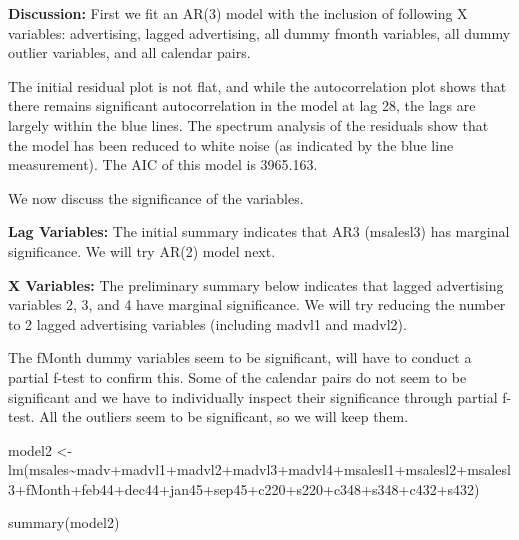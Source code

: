 \documentclass[
]{article}
\newenvironment{Shaded}{\begin{snugshade}}{\end{snugshade}}
\newcommand{\FunctionTok}[1]{\textcolor[rgb]{0.00,0.00,0.00}{#1}}
\newcommand{\NormalTok}[1]{#1}
\newcommand{\OtherTok}[1]{\textcolor[rgb]{0.56,0.35,0.01}{#1}}
\newcommand{\SpecialCharTok}[1]{\textcolor[rgb]{0.00,0.00,0.00}{#1}}
\begin{document}
\textbf{Discussion:} First we fit an AR(3) model with the inclusion of
following X variables: advertising, lagged advertising, all dummy fmonth
variables, all dummy outlier variables, and all calendar pairs.

The initial residual plot is not flat, and while the autocorrelation
plot shows that there remains significant autocorrelation in the model
at lag 28, the lags are largely within the blue lines. The spectrum
analysis of the residuals show that the model has been reduced to white
noise (as indicated by the blue line measurement). The AIC of this model
is 3965.163.

We now discuss the significance of the variables.

\textbf{Lag Variables:} The initial summary indicates that AR3
(msalesl3) has marginal significance. We will try AR(2) model next.

\textbf{X Variables:} The preliminary summary below indicates that
lagged advertising variables 2, 3, and 4 have marginal significance. We
will try reducing the number to 2 lagged advertising variables
(including madvl1 and madvl2).

The fMonth dummy variables seem to be significant, will have to conduct
a partial f-test to confirm this. Some of the calendar pairs do not seem
to be significant and we have to individually inspect their significance
through partial f-test. All the outliers seem to be significant, so we
will keep them.

\begin{Shaded}
\begin{Highlighting}[]
\NormalTok{model2 }\OtherTok{\textless{}{-}} \FunctionTok{lm}\NormalTok{(msales}\SpecialCharTok{\textasciitilde{}}\NormalTok{madv}\SpecialCharTok{+}\NormalTok{madvl1}\SpecialCharTok{+}\NormalTok{madvl2}\SpecialCharTok{+}\NormalTok{madvl3}\SpecialCharTok{+}\NormalTok{madvl4}\SpecialCharTok{+}\NormalTok{msalesl1}\SpecialCharTok{+}\NormalTok{msalesl2}\SpecialCharTok{+}\NormalTok{msalesl3}\SpecialCharTok{+}\NormalTok{fMonth}\SpecialCharTok{+}\NormalTok{feb44}\SpecialCharTok{+}\NormalTok{dec44}\SpecialCharTok{+}\NormalTok{jan45}\SpecialCharTok{+}\NormalTok{sep45}\SpecialCharTok{+}\NormalTok{c220}\SpecialCharTok{+}\NormalTok{s220}\SpecialCharTok{+}\NormalTok{c348}\SpecialCharTok{+}\NormalTok{s348}\SpecialCharTok{+}\NormalTok{c432}\SpecialCharTok{+}\NormalTok{s432)}

\FunctionTok{summary}\NormalTok{(model2)}
\end{Highlighting}
\end{Shaded}
\end{document}
